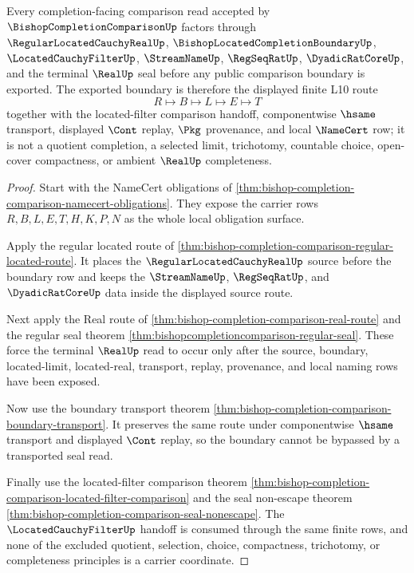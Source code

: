 \begin{theorem}
\label{thm:bishop-completion-comparison-l10-scope}
Every completion-facing comparison read accepted by $\BishopCompletionComparisonUp$ factors through $\RegularLocatedCauchyRealUp$, $\BishopLocatedCompletionBoundaryUp$, $\LocatedCauchyFilterUp$, $\StreamNameUp$, $\RegSeqRatUp$, $\DyadicRatCoreUp$, and the terminal $\RealUp$ seal before any public comparison boundary is exported. The exported boundary is therefore the displayed finite L10 route
$$
R\longmapsto B\longmapsto L\longmapsto E\longmapsto T
$$
together with the located-filter comparison handoff, componentwise $\hsame$ transport, displayed $\Cont$ replay, $\Pkg$ provenance, and local $\NameCert$ row; it is not a quotient completion, a selected limit, trichotomy, countable choice, open-cover compactness, or ambient $\RealUp$ completeness.
\end{theorem}
\begin{proof}
Start with the NameCert obligations of \autoref{thm:bishop-completion-comparison-namecert-obligations}. They expose the carrier rows $R,B,L,E,T,H,K,P,N$ as the whole local obligation surface.

Apply the regular located route of \autoref{thm:bishop-completion-comparison-regular-located-route}. It places the $\RegularLocatedCauchyRealUp$ source before the boundary row and keeps the $\StreamNameUp$, $\RegSeqRatUp$, and $\DyadicRatCoreUp$ data inside the displayed source route.

Next apply the Real route of \autoref{thm:bishop-completion-comparison-real-route} and the regular seal theorem \autoref{thm:bishopcompletioncomparison-regular-seal}. These force the terminal $\RealUp$ read to occur only after the source, boundary, located-limit, located-real, transport, replay, provenance, and local naming rows have been exposed.

Now use the boundary transport theorem \autoref{thm:bishop-completion-comparison-boundary-transport}. It preserves the same route under componentwise $\hsame$ transport and displayed $\Cont$ replay, so the boundary cannot be bypassed by a transported seal read.

Finally use the located-filter comparison theorem \autoref{thm:bishop-completion-comparison-located-filter-comparison} and the seal non-escape theorem \autoref{thm:bishop-completion-comparison-seal-nonescape}. The $\LocatedCauchyFilterUp$ handoff is consumed through the same finite rows, and none of the excluded quotient, selection, choice, compactness, trichotomy, or completeness principles is a carrier coordinate.
\end{proof}

